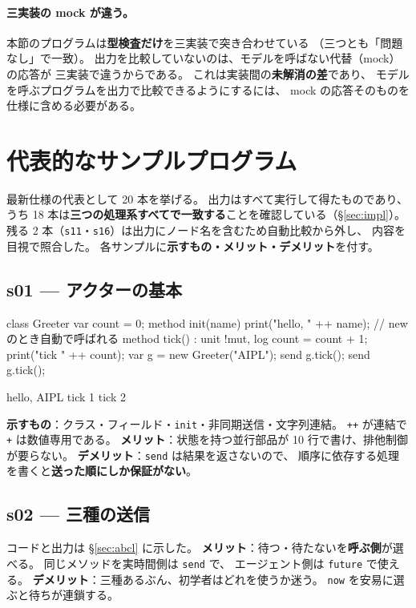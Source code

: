 \documentclass[11pt,a4paper]{ltjsarticle}
\theoremstyle{definition}
\theoremstyle{remark}
\begin{document}
\paragraph{三実装の mock が違う。}
本節のプログラムは\textbf{型検査だけ}を三実装で突き合わせている
（三つとも「問題なし」で一致）。
出力を比較していないのは、モデルを呼ばない代替（mock）の応答が
三実装で違うからである。
これは実装間の\textbf{未解消の差}であり、
モデルを呼ぶプログラムを出力で比較できるようにするには、
mock の応答そのものを仕様に含める必要がある。


\section{代表的なサンプルプログラム}
\label{sec:samples}

最新仕様の代表として 20 本を挙げる。
出力はすべて実行して得たものであり、
うち 18 本は\textbf{三つの処理系すべてで一致する}ことを確認している（\S\ref{sec:impl}）。
残る 2 本（\texttt{s11}・\texttt{s16}）は出力にノード名を含むため自動比較から外し、
内容を目視で照合した。
各サンプルに\textbf{示すもの・メリット・デメリット}を付す。

\subsection{s01 --- アクターの基本}
\begin{aipl}
class Greeter {
  var count = 0;
  method init(name) { print("hello, " ++ name); }   // new のとき自動で呼ばれる
  method tick() : unit !{mut, log} {
    count = count + 1;
    print("tick " ++ count);
  }
}
var g = new Greeter("AIPL");
send g.tick();
send g.tick();
\end{aipl}
\begin{term}
hello, AIPL
tick 1
tick 2
\end{term}
\textbf{示すもの}：クラス・フィールド・\texttt{init}・非同期送信・文字列連結。
\texttt{++} が連結で \texttt{+} は数値専用である。
\textbf{メリット}：状態を持つ並行部品が 10 行で書け、排他制御が要らない。
\textbf{デメリット}：\texttt{send} は結果を返さないので、
順序に依存する処理を書くと\textbf{送った順にしか保証がない}。

\subsection{s02 --- 三種の送信}
コードと出力は \S\ref{sec:abcl} に示した。
\textbf{メリット}：待つ・待たないを\textbf{呼ぶ側}が選べる。
同じメソッドを実時間側は \texttt{send} で、
エージェント側は \texttt{future} で使える。
\textbf{デメリット}：三種あるぶん、初学者はどれを使うか迷う。
\texttt{now} を安易に選ぶと待ちが連鎖する。
\end{document}
